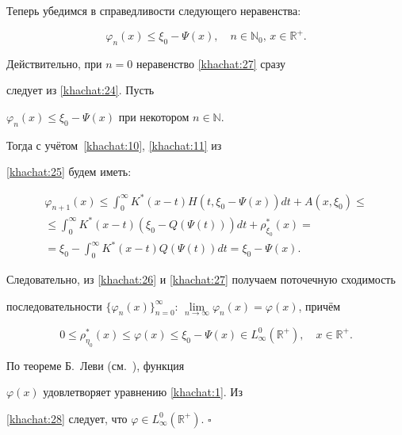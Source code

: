 Теперь убедимся в справедливости следующего неравенства:

\begin{equation}

\varphi_n(x)\leq\xi_0-\Psi(x),\quad

n\in\mathbb{N}_0,\,x\in\mathbb{R}^+.\label{khachat:27}

\end{equation}

Действительно, при $n=0$ неравенство \eqref{khachat:27} сразу

следует из \eqref{khachat:24}. Пусть

$\varphi_n(x)\leq\xi_0-\Psi(x)$ при некотором $n\in\mathbb{N}.$

Тогда с учётом~\eqref{khachat:10}, \eqref{khachat:11} из

\eqref{khachat:25} будем иметь:

\begin{multline*}

\varphi_{n+1}(x)\leq\int _{0}^{\infty}K^*(x-t)H(t,\xi_0-\Psi(x))dt+A(x,\xi_0)\leq\\

\leq\int _{0}^{\infty}K^*(x-t)(\xi_0-Q(\Psi(t)))dt+\rho_{\xi_0}^*(x)=\\

=\xi_0-\int _{0}^{\infty}K^*(x-t)Q(\Psi(t))dt=\xi_0-\Psi(x).

\end{multline*}

Следовательно, из \eqref{khachat:26} и \eqref{khachat:27} получаем поточечную сходимость

последовательности $\{\varphi_n(x)\}_{n=0}^{\infty}$: $\lim\limits_{n\rightarrow\infty}\varphi_n(x)=\varphi(x)$, причём 

\begin{equation}

0\leq\rho_{\eta_0}^*(x)\leq\varphi(x)\leq\xi_0-\Psi(x)\in

L_{\infty}^0(\mathbb{R}^+),\quad

x\in\mathbb{R}^+.\label{khachat:28}

\end{equation}

По теореме Б.~Леви (см.~\cite{popovkoval:bib:Kolmogorov}), функция

$\varphi(x)$ удовлетворяет уравнению \eqref{khachat:1}. Из

\eqref{khachat:28} следует, что $\varphi\in

L_{\infty}^0(\mathbb{R}^+).$ $\square$

